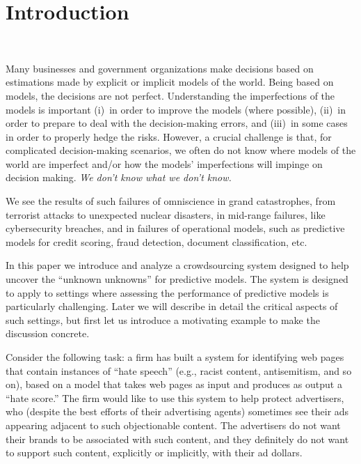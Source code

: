 

\section{Introduction}


~

Many businesses and government organizations make decisions based on
estimations made by explicit or implicit models of the world.  Being
based on models, the decisions are not perfect.  Understanding the
imperfections of the models is important (i)~in order to improve the
models (where possible), (ii)~in order to prepare to deal with the
decision-making errors, and (iii)~in some cases in order to properly
hedge the risks.  However, a crucial challenge is that, for 
complicated decision-making scenarios, we often do not know where 
models of the world are imperfect and/or how the models' imperfections
will impinge on decision making. \emph{ We don't know what we don't know.}

We see the results of such failures of omniscience in grand
catastrophes, from terrorist attacks to unexpected nuclear disasters,
in mid-range failures, like cybersecurity breaches, and in failures of
operational models, such as predictive models for credit scoring,
fraud detection, document classification, etc.

In this paper we introduce and analyze a crowdsourcing system designed
to help uncover the ``unknown unknowns'' for predictive models.  The
system is designed to apply to settings where assessing the
performance of predictive models is particularly challenging.  Later we
will describe in detail the critical aspects of such settings, but
first let us introduce a motivating example to make the discussion
concrete.

Consider the following task: a firm has built a system for identifying
web pages that contain instances of ``hate speech'' (e.g., racist
content, antisemitism, and so on), based on a model that takes web
pages as input and produces as output a ``hate score.''  The firm
would like to use this system to help protect advertisers, who
(despite the best efforts of their advertising agents) sometimes see
their ads appearing adjacent to such objectionable content.  The
advertisers do not want their brands to be associated with such
content, and they definitely do not want to support such content,
explicitly or implicitly, with their ad dollars.  

